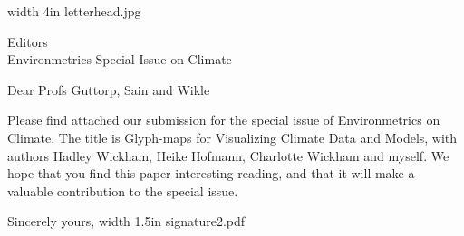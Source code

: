 \documentclass{letter}
\makeatletter
\def\apl#1#2{
\begin{letter}{#1}
\signature{Professor Dianne Cook\\Department of Statistics\\Iowa State University 
\\Ames, Iowa 50011-1210\\ Phone (515) 294 8865\\{\tt dicook@iastate.edu}}
\opening{{Dear #2}}

Please find attached our submission for the special issue of Environmetrics on Climate. The title is Glyph-maps for Visualizing Climate Data and Models, with authors Hadley Wickham, Heike Hofmann, Charlotte Wickham and myself. We hope that you find this paper interesting reading, and that it will make a valuable contribution  to the special issue.

\closing{Sincerely yours,
{\pdfimage width 1.5in {signature2.pdf}}}
\end{letter}}
\makeatother
\begin{document}
{{\pdfimage width 4in {letterhead.jpg}}}
\apl{Editors \\Environmetrics Special Issue on Climate}{Profs Guttorp, Sain and Wikle}
\end{document}
